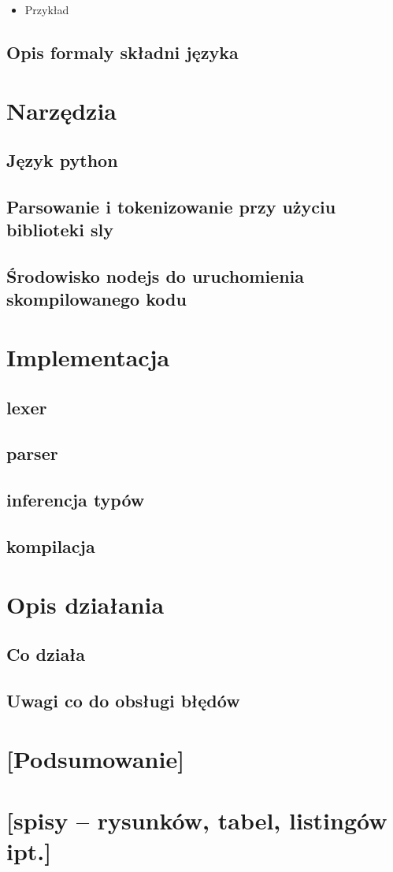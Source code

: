 \documentclass{article}
\begin{document}
\begin{itemize}
  \item Przykład
    
    
\end{itemize}
\subsection{Opis formaly składni języka}
\section{Narzędzia}
\subsection{Język python}
\subsection{Parsowanie i tokenizowanie przy użyciu biblioteki sly}
\subsection{Środowisko nodejs do uruchomienia skompilowanego kodu}
\section{Implementacja}
\subsection{lexer}
\subsection{parser}
\subsection{inferencja typów}
\subsection{kompilacja}
\section{Opis działania}
\subsection{Co działa}
\subsection{Uwagi co do obsługi błędów}
\section{[Podsumowanie]}
\section{[spisy -- rysunków, tabel, listingów ipt.]}


\end{document}
